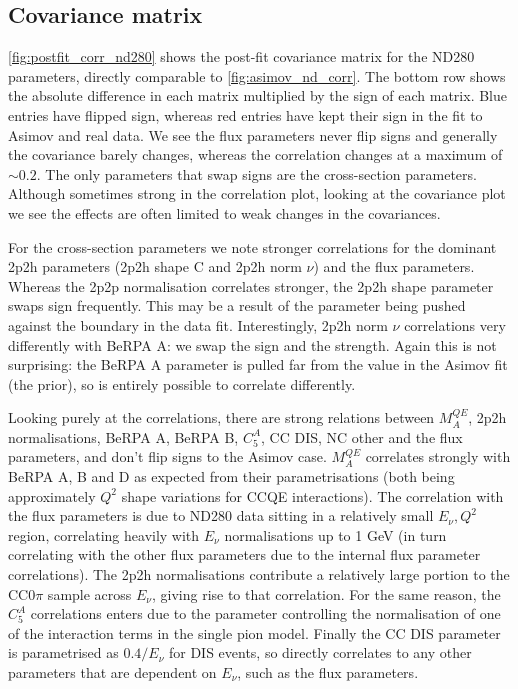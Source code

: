 \subsection{Covariance matrix}
\label{sec:covariance_data}
\autoref{fig:postfit_corr_nd280} shows the post-fit covariance matrix for the ND280 parameters, directly comparable to \autoref{fig:asimov_nd_corr}. The bottom row shows the absolute difference in each matrix multiplied by the sign of each matrix. Blue entries have flipped sign, whereas red entries have kept their sign in the fit to Asimov and real data. We see the flux parameters never flip signs and generally the covariance barely changes, whereas the correlation changes at a maximum of $\sim0.2$. The only parameters that swap signs are the cross-section parameters. Although sometimes strong in the correlation plot, looking at the covariance plot we see the effects are often limited to weak changes in the covariances.

For the cross-section parameters we note stronger correlations for the dominant 2p2h parameters (2p2h shape C and 2p2h norm $\nu$) and the flux parameters. Whereas the 2p2p normalisation correlates stronger, the 2p2h shape parameter swaps sign frequently. This may be a result of the parameter being pushed against the boundary in the data fit. Interestingly, 2p2h norm $\nu$ correlations very differently with BeRPA A: we swap the sign and the strength. Again this is not surprising: the BeRPA A parameter is pulled far from the value in the Asimov fit (the prior), so is entirely possible to correlate differently.

Looking purely at the correlations, there are strong relations between $M_A^{QE}$, 2p2h normalisations, BeRPA A, BeRPA B, $C_5^A$, CC DIS, NC other and the flux parameters, and don't flip signs to the Asimov case. $M_A^{QE}$ correlates strongly with BeRPA A, B and D as expected from their parametrisations (both being approximately $Q^2$ shape variations for CCQE interactions). The correlation with the flux parameters is due to ND280 data sitting in a relatively small $E_\nu, Q^2$ region, correlating heavily with $E_\nu$ normalisations up to 1 GeV (in turn correlating with the other flux parameters due to the internal flux parameter correlations). The 2p2h normalisations contribute a relatively large portion to the CC0$\pi$ sample across $E_\nu$, giving rise to that correlation. For the same reason, the $C_5^A$ correlations enters due to the parameter controlling the normalisation of one of the interaction terms in the single pion model. Finally the CC DIS parameter is parametrised as $0.4/E_\nu$ for DIS events, so directly correlates to any other parameters that are dependent on $E_\nu$, such as the flux parameters.

